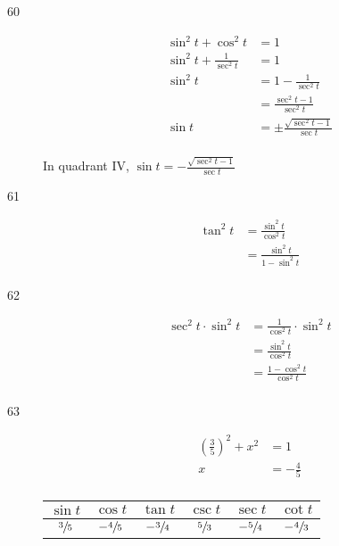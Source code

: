 \documentclass{exam}
\begin{document}
\begin{description}
      \item[60] 
        \begin{align*}
          \sin^2 t + \cos^2 t           & = 1 \\
          \sin^2 t + \frac{1}{\sec^2 t} & = 1 \\
          \sin^2 t                      & = 1 - \frac{1}{\sec^2 t} \\
                                        & = \frac{\sec^2 t - 1}{\sec^2 t} \\
          \sin t                        & = \pm \frac{ \sqrt{\sec^2 t - 1} }{\sec t} \\
        \end{align*}

        In quadrant IV, $\sin t = \boxed{ - \frac{ \sqrt{\sec^2 t - 1} }{\sec t} }$ 

      \item[61] 
        \begin{align*}
          \tan^2 t & = \frac{\sin^2 t}{\cos^2 t} \\
                   & = \boxed{ \frac{\sin^2 t}{1 - \sin^2 t} } \\
        \end{align*}

      \item[62] 
        \begin{align*}
          \sec^2 t \cdot \sin^2 t & = \frac{1}{\cos^2 t} \cdot \sin^2 t \\
                                  & = \frac{\sin^2 t}{\cos^2 t} \\
                                  & = \boxed{ \frac{1 - \cos^2 t}{\cos^2 t} } \\
        \end{align*}

      \pagebreak

      \item[63]
        \begin{align*}
          \left( \frac{3}{5} \right)^2 + x^2 & = 1 \\
          x                                  & = -\frac{4}{5} \\
        \end{align*}

        \begin{tabular}[H]{cccccc}
          \toprule
          $\sin t$      & $\cos t$        & $\tan t$        & $\csc t$      & $\sec t$        & $\cot t$ \\
          \midrule
          $\sfrac{3}{5}$ & $- \sfrac{4}{5}$ & $- \sfrac{3}{4}$ & $\sfrac{5}{3}$ & $- \sfrac{5}{4}$ & $- \sfrac{4}{3}$ \\
          \bottomrule
        \end{tabular}


\end{description}
\end{document}
